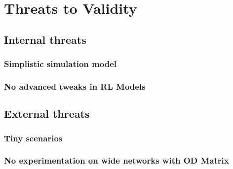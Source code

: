 \chapter{Threats to Validity}

\section{Internal threats}
  \subsection{Simplistic simulation model}
  \subsection{No advanced tweaks in RL Models}

\section{External threats}
  \subsection{Tiny scenarios}
  \subsection{No experimentation on wide networks with OD Matrix}

